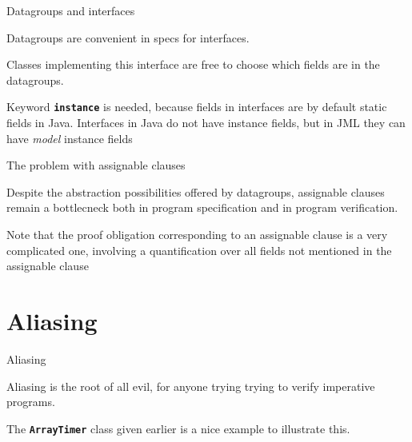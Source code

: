 \documentclass[
pdf,
nocolorBG,
slideColor,
erik,
]{prosper}
\newcommand{\code}[1]{{\rm \texttt{\textbf{\small #1}}}}
\begin{document}
\begin{slide}{Datagroups and interfaces}
\vspace*{-3ex}

Datagroups are convenient in specs for interfaces.



Classes implementing this interface are free to choose which fields
are in the datagroups.

{\scriptsize\rm Keyword \texttt{\textbf{instance}} is needed, because fields in interfaces
are by default static fields in Java.
Interfaces in Java do not have instance fields,
but in JML they can have \textit{model} instance fields
}


\end{slide}


\begin{slide}{The problem with assignable clauses}
\vspace*{-3ex}

Despite the abstraction possibilities offered by datagroups,
assignable clauses remain a bottlecneck both in program specification
and in program verification.

\medskip

{\scriptsize\rm Note that the proof obligation corresponding to an assignable
clause is a very complicated one, involving a quantification
over all fields not mentioned in the assignable clause}

\end{slide}



\part{{\Large \red Aliasing}}

\begin{slide}{Aliasing}
\vspace*{-3ex}

Aliasing is the root of all evil, for anyone trying trying to verify 
imperative programs.

\medskip

The \code{ArrayTimer} class given earlier is a nice example
to illustrate this.

\end{slide}
\end{document}
